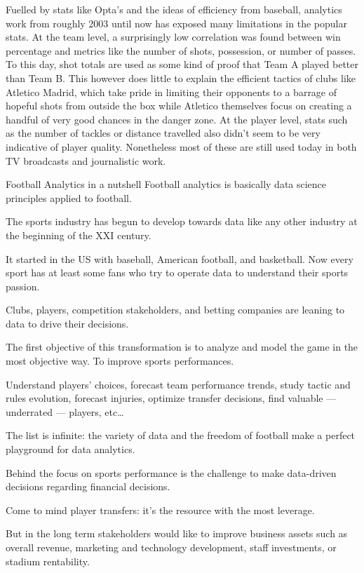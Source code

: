 Fuelled by stats like Opta’s and the ideas of efficiency from baseball, analytics work from roughly 2003 until now has exposed many limitations in the popular stats. At the team level, a surprisingly low correlation was found between win percentage and metrics like the number of shots, possession, or number of passes. To this day, shot totals are used as some kind of proof that Team A played better than Team B. This however does little to explain the efficient tactics of clubs like Atletico Madrid, which take pride in limiting their opponents to a barrage of hopeful shots from outside the box while Atletico themselves focus on creating a handful of very good chances in the danger zone. At the player level, stats such as the number of tackles or distance travelled also didn’t seem to be very indicative of player quality. Nonetheless most of these are still used today in both TV broadcasts and journalistic work.


Football Analytics in a nutshell
Football analytics is basically data science principles applied to football.

The sports industry has begun to develop towards data like any other industry at the beginning of the XXI century.

It started in the US with baseball, American football, and basketball. Now every sport has at least some fans who try to operate data to understand their sports passion.

Clubs, players, competition stakeholders, and betting companies are leaning to data to drive their decisions.

The first objective of this transformation is to analyze and model the game in the most objective way. To improve sports performances.

Understand players' choices, forecast team performance trends, study tactic and rules evolution, forecast injuries, optimize transfer decisions, find valuable — underrated — players, etc…

The list is infinite: the variety of data and the freedom of football make a perfect playground for data analytics.

Behind the focus on sports performance is the challenge to make data-driven decisions regarding financial decisions.

Come to mind player transfers: it’s the resource with the most leverage.

But in the long term stakeholders would like to improve business assets such as overall revenue, marketing and technology development, staff investments, or stadium rentability.

